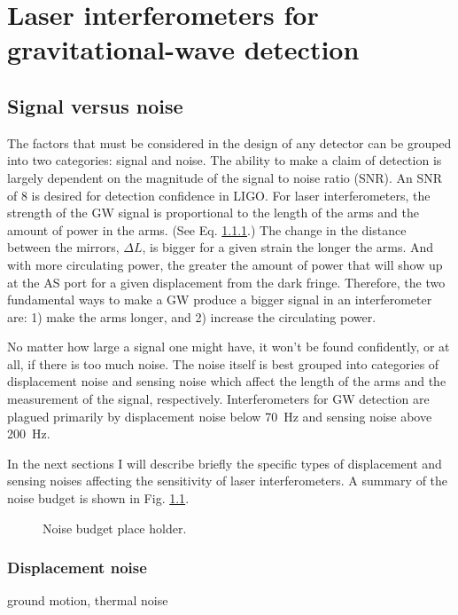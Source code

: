 \chapter{Laser interferometers for gravitational-wave detection}

\section{Signal versus noise}
The factors that must be considered in the design of any detector can
be grouped into two categories: signal and noise. The ability to make
a claim of detection is largely dependent on the magnitude of the
signal to noise ratio (SNR). An SNR of 8 is desired for detection
confidence in LIGO. For laser interferometers, the strength of the GW
signal is proportional to the length of the arms and the amount of
power in the arms. (See Eq. \ref{}.) The change in the distance
between the mirrors, $\Delta L$, is bigger for a given strain the
longer the arms. And with more circulating power, the greater the
amount of power that will show up at the AS port for a given
displacement from the dark fringe. Therefore, the two fundamental ways
to make a GW produce a bigger signal in an interferometer are: 1) make
the arms longer, and 2) increase the circulating power.

No matter how large a signal one might have, it won't be found
confidently, or at all, if there is too much noise. The noise itself
is best grouped into categories of displacement noise and sensing
noise which affect the length of the arms and the measurement of the
signal, respectively. Interferometers for GW detection are plagued
primarily by displacement noise below 70~Hz and sensing noise above
200~Hz.

In the next sections I will describe briefly the specific types of
displacement and sensing noises affecting the sensitivity of laser
interferometers. A summary of the noise budget is shown in
Fig. \ref{fig:NB}. 


\begin{figure}
\begin{centering}
\caption{Noise budget place holder.}
\label{fig:NB}
\end{centering}
\end{figure}


\subsection{Displacement noise} 
ground motion, thermal noise

